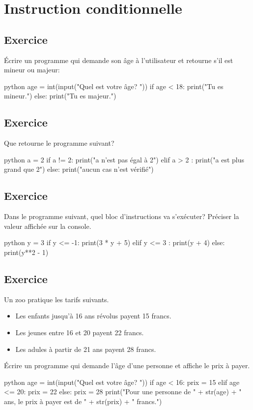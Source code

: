 \documentclass[a4paper,11pt]{article}
\begin{document}
\section{Instruction conditionnelle}

\subsection{Exercice}
Écrire un programme qui demande son âge à l'utilisateur et retourne s'il est mineur ou majeur:\\
\begin{solution}
\begin{code}[interactive]{python}
age = int(input("Quel est votre âge? "))
if age < 18:
  print("Tu es mineur.")
else:
  print("Tu es majeur.")
\end{code}
\end{solution}

\subsection{Exercice}
Que retourne le programme suivant?
\begin{code}[interactive]{python}
a = 2
if a != 2:
    print("a n'est pas égal à 2")
elif a > 2 :
    print("a est plus grand que 2")
else:
    print("aucun cas n'est vérifié")
\end{code}

\subsection{Exercice}
Dans le programme suivant, quel bloc d'instructions va s'exécuter? Préciser la valeur affichée sur la console.
\begin{code}[interactive]{python}
y = 3
if y <= -1:
    print(3 * y + 5)
elif y <= 3 :
    print(y + 4)
else:
    print(y**2 - 1)
\end{code}

\subsection{Exercice}
Un zoo pratique les tarifs suivants.\\
\begin{itemize}
    \item Les enfants jusqu'à 16 ans révolus payent 15 francs.
    \item Les jeunes entre 16 et 20 payent 22 francs.
    \item Les adules à partir de 21 ans payent 28 francs.
\end{itemize}
Écrire un programme qui demande l'âge d'une personne et affiche le prix à payer.
\begin{solution}
\begin{code}[interactive]{python}
age = int(input("Quel est votre âge? "))
if age < 16:
    prix = 15
elif age <= 20:
    prix = 22
else:
    prix = 28
print("Pour une personne de " + str(age) + " ans, le prix à payer est de " + str(prix) + " francs.")
\end{code}
\end{solution}
\end{document}

